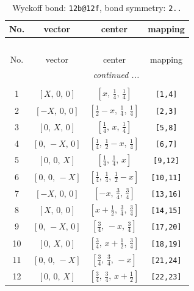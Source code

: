 \documentclass[fleqn,8pt]{jsarticle}
\begin{document}
\renewcommand{\arraystretch}{1.2}
\begin{longtable}{cccc}
\caption{Wyckoff bond: {\tt 12b@12f}, bond symmetry: {\tt 2..}}
 \\
 \hline \hline
No. & vector & center & mapping \\ \hline \endfirsthead

\multicolumn{3}{l}{\tablename\ \thetable{}} \\
 \hline \hline
No. & vector & center & mapping \\ \hline \endhead

 \hline \hline
\multicolumn{3}{r}{\footnotesize\it continued ...} \\ \endfoot

 \hline \hline
\multicolumn{3}{r}{} \\ \endlastfoot

1 & $\left[ X,\, 0,\, 0 \right]$ & $\left[ x,\, \frac{1}{4},\, \frac{1}{4} \right]$ & {\tt [1,4]} \\ \hline
2 & $\left[ - X,\, 0,\, 0 \right]$ & $\left[ \frac{1}{2} - x,\, \frac{1}{4},\, \frac{1}{4} \right]$ & {\tt [2,3]} \\ \hline
3 & $\left[ 0,\, X,\, 0 \right]$ & $\left[ \frac{1}{4},\, x,\, \frac{1}{4} \right]$ & {\tt [5,8]} \\ \hline
4 & $\left[ 0,\, - X,\, 0 \right]$ & $\left[ \frac{1}{4},\, \frac{1}{2} - x,\, \frac{1}{4} \right]$ & {\tt [6,7]} \\ \hline
5 & $\left[ 0,\, 0,\, X \right]$ & $\left[ \frac{1}{4},\, \frac{1}{4},\, x \right]$ & {\tt [9,12]} \\ \hline
6 & $\left[ 0,\, 0,\, - X \right]$ & $\left[ \frac{1}{4},\, \frac{1}{4},\, \frac{1}{2} - x \right]$ & {\tt [10,11]} \\ \hline
7 & $\left[ - X,\, 0,\, 0 \right]$ & $\left[ - x,\, \frac{3}{4},\, \frac{3}{4} \right]$ & {\tt [13,16]} \\ \hline
8 & $\left[ X,\, 0,\, 0 \right]$ & $\left[ x + \frac{1}{2},\, \frac{3}{4},\, \frac{3}{4} \right]$ & {\tt [14,15]} \\ \hline
9 & $\left[ 0,\, - X,\, 0 \right]$ & $\left[ \frac{3}{4},\, - x,\, \frac{3}{4} \right]$ & {\tt [17,20]} \\ \hline
10 & $\left[ 0,\, X,\, 0 \right]$ & $\left[ \frac{3}{4},\, x + \frac{1}{2},\, \frac{3}{4} \right]$ & {\tt [18,19]} \\ \hline
11 & $\left[ 0,\, 0,\, - X \right]$ & $\left[ \frac{3}{4},\, \frac{3}{4},\, - x \right]$ & {\tt [21,24]} \\ \hline
12 & $\left[ 0,\, 0,\, X \right]$ & $\left[ \frac{3}{4},\, \frac{3}{4},\, x + \frac{1}{2} \right]$ & {\tt [22,23]} \\
\end{longtable}
\end{document}
